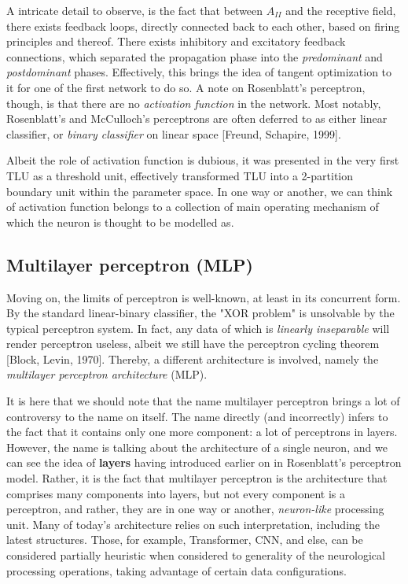 A intricate detail to observe, is the fact that between $A_{II}$ and the receptive field, there exists feedback loops, directly connected back to each other, based on firing principles and thereof. There exists inhibitory and excitatory feedback connections, which separated the propagation phase into the \textit{predominant} and \textit{postdominant} phases. Effectively, this brings the idea of tangent optimization to it for one of the first network to do so. A note on Rosenblatt's perceptron, though, is that there are no \textit{activation function} in the network. Most notably, Rosenblatt's and McCulloch's perceptrons are often deferred to as either linear classifier, or \textit{binary classifier} on linear space [Freund, Schapire, 1999]. 

Albeit the role of activation function is dubious, it was presented in the very first TLU as a threshold unit, effectively transformed TLU into a 2-partition boundary unit within the parameter space. In one way or another, we can think of activation function belongs to a collection of main operating mechanism of which the neuron is thought to be modelled as. 

\subsection{Multilayer perceptron (MLP)}

Moving on, the limits of perceptron is well-known, at least in its concurrent form. By the standard linear-binary classifier, the "XOR problem" is unsolvable by the typical perceptron system. In fact, any data of which is \textit{linearly inseparable} will render perceptron useless, albeit we still have the perceptron cycling theorem [Block, Levin, 1970]. Thereby, a different architecture is involved, namely the \textit{multilayer perceptron architecture} (MLP).

It is here that we should note that the name multilayer perceptron brings a lot of controversy to the name on itself. The name directly (and incorrectly) infers to the fact that it contains only one more component: a lot of perceptrons in layers. However, the name is talking about the architecture of a single neuron, and we can see the idea of \textbf{layers} having introduced earlier on in Rosenblatt's perceptron model. Rather, it is the fact that multilayer perceptron is the architecture that comprises many components into layers, but not every component is a perceptron, and rather, they are in one way or another, \textit{neuron-like} processing unit. Many of today's architecture relies on such interpretation, including the latest structures. Those, for example, Transformer, CNN, and else, can be considered partially heuristic when considered to generality of the neurological processing operations, taking advantage of certain data configurations. 

